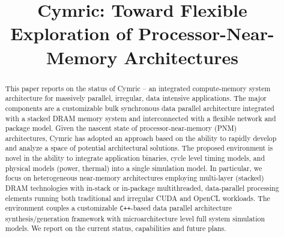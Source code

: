 \documentclass[pageno]{jpaper}
\newcommand{\name}{Cymric }
\newcommand{\namens}{Cymric}
\begin{document}
\title{\namens: Toward Flexible Exploration of Processor-Near-Memory Architectures}

\date{}
\maketitle



\begin{abstract}

This paper reports on the status of {\name}-- an integrated compute-memory system architecture for massively parallel, irregular, data intensive applications.
The major components are a customizable bulk synchronous data parallel architecture integrated with a stacked DRAM memory system and interconnected with a flexible network and package model.
Given the nascent state of processor-near-memory (PNM) architectures, \name has adopted an approach based on the ability to rapidly develop and analyze a space of potential architectural solutions.
The proposed environment is novel in the ability to integrate application binaries, cycle level timing models, and physical models (power, thermal) into a single simulation model.
In particular, we focus on heterogeneous near-memory architectures employing multi-layer (stacked) DRAM technologies with in-stack or in-package multithreaded, data-parallel processing elements running both traditional and irregular CUDA and OpenCL workloads.
The environment couples a customizable \texttt{C++}-based data parallel architecture synthesis/generation framework with microarchitecture level full system simulation models.
We report on the current status, capabilities and future plans. 

\end{abstract}
\end{document}
